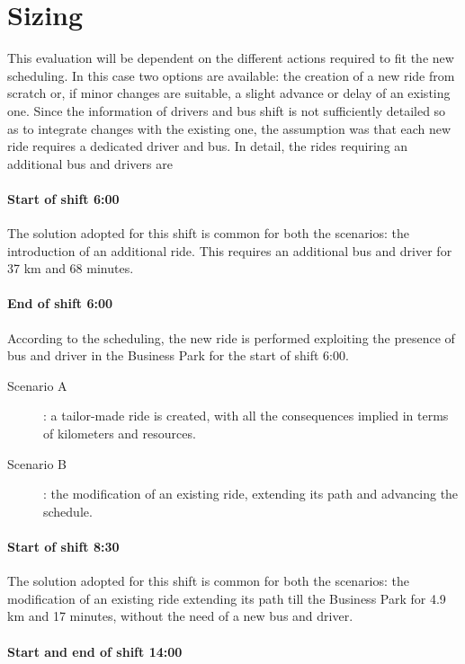 \section{Sizing}
This evaluation will be dependent on the different actions required to fit the new scheduling. In this case two options are available: the creation of a new ride from scratch or, if minor changes are suitable, a slight advance or delay of an existing one. Since the information of drivers and bus shift is not sufficiently detailed so as to integrate changes with the existing one, the assumption was that each new ride requires a dedicated driver and bus.
In detail, the rides requiring an additional bus and drivers are 
\paragraph{Start of shift 6:00}

The solution adopted for this shift is common for both the scenarios: the introduction of an additional ride. This requires an additional bus and driver for 37 km and 68 minutes.
\paragraph{End of shift 6:00}

According to the scheduling, the new ride is performed exploiting the presence of bus and driver in the Business Park for the start of shift 6:00. 
\begin{description}
    \item[Scenario A]: a tailor-made ride is created, with all the consequences implied in terms of kilometers and resources.
    \item[Scenario B]: the modification of an existing ride, extending its path and advancing the schedule.
\end{description}

\paragraph{Start of shift 8:30}

The solution adopted for this shift is common for both the scenarios: the modification of an existing ride extending its path till the Business Park for 4.9 km and 17 minutes, without the need of a new bus and driver.
\paragraph{Start and end of shift 14:00}

